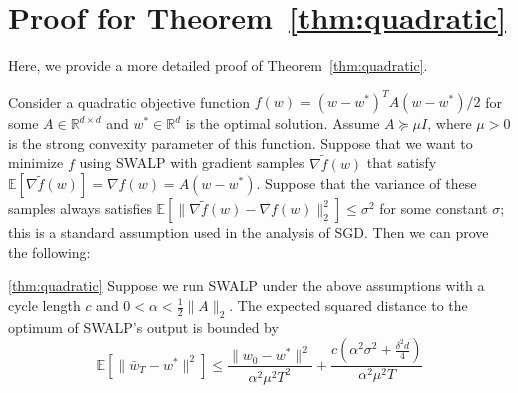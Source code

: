 
\section{Proof for Theorem~\ref{thm:quadratic}}\label{sec:appendix-thm-quadratic}

Here, we provide a more detailed proof of Theorem~\ref{thm:quadratic}.

Consider a quadratic objective function $f(w) = (w - w^*)^T A (w - w^*) / 2$ for some $A \in \mathbb{R}^{d \times d}$ and $w^* \in \mathbb{R}^d$ is the optimal solution.
Assume $A \succeq \mu I$, where $\mu > 0$ is the strong convexity parameter of this function.
Suppose that we want to minimize $f$ using SWALP with gradient samples $\nabla \tilde f(w)$ that satisfy $\mathbb{E}[\nabla \tilde f(w)] = \nabla f(w) = A (w - w^*)$.
Suppose that the variance of these samples always satisfies $\mathbb{E}[\| \nabla \tilde f(w) - \nabla f(w) \|_2^2] \le \sigma^2$ for some constant $\sigma$; this is a standard assumption used in the analysis of SGD.
Then we can prove the following:

\begin{customthm}{\ref{thm:quadratic}}
Suppose we run SWALP under the above assumptions with a cycle length $c$ and $0 < \alpha < \frac{1}{2}\|A\|_2$.
The expected squared distance to the optimum of SWALP's output is bounded by
\[{
\mathbb{E}\left[\|\bar{w}_T - w^*\|^2 \right]
\leq
\frac{\|w_0 - w^*\|^2}{\alpha^2\mu^2T^2} + 
\frac{c(\alpha^2\sigma^2 + \frac{\delta^2d}{4})}{\alpha^2\mu^2T}
}\]
\end{customthm}

